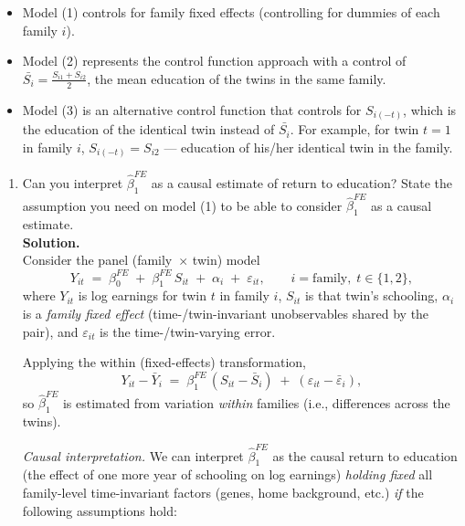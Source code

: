 \documentclass[12pt]{article}
\begin{document}
\begin{itemize}
  \item Model (1) controls for family fixed effects (controlling for dummies of each family $i$).
  \item Model (2) represents the control function approach with a control of $\bar{S_i} = \frac{S_{i1}+S_{i2}}{2}$, the mean education of the twins in the same family.
  \item Model (3) is an alternative control function that controls for $S_{i(-t)}$, which is the education of the identical twin instead of $\bar{S_i}$. For example, for twin $t=1$ in family $i$, $S_{i(-t)}=S_{i2}$ — education of his/her identical twin in the family.
\end{itemize}

\begin{enumerate}[label=\textbf{(\alph*)}, leftmargin=1.5em]
  \item Can you interpret $\hat{\beta}_1^{FE}$ as a causal estimate of return to education? State the assumption you need on model (1) to be able to consider $\hat{\beta}_1^{FE}$ as a causal estimate.\\[0.5em]
  
  \textbf{Solution.} \\
  Consider the panel (family~$\times$ twin) model
    \[
    Y_{it} \;=\; \beta^{FE}_0 \;+\; \beta^{FE}_1\, S_{it} \;+\; \alpha_i \;+\; \varepsilon_{it},
    \qquad i=\text{family},\; t\in\{1,2\},
    \]
    where $Y_{it}$ is log earnings for twin $t$ in family $i$, $S_{it}$ is that twin’s schooling,
    $\alpha_i$ is a \emph{family fixed effect} (time-/twin-invariant unobservables shared by the pair),
    and $\varepsilon_{it}$ is the time-/twin-varying error.

    Applying the within (fixed-effects) transformation,
    \[
    Y_{it}-\bar Y_i \;=\; \beta^{FE}_1\,(S_{it}-\bar S_i) \;+\; (\varepsilon_{it}-\bar\varepsilon_i),
    \]
    so $\hat\beta^{FE}_1$ is estimated from variation \emph{within} families (i.e., differences across the twins).

    \smallskip
    \emph{Causal interpretation.}
    We can interpret $\hat\beta^{FE}_1$ as the causal return to education (the effect of one more year of schooling on log earnings) \emph{holding fixed} all family-level time-invariant factors (genes, home background, etc.) \emph{if} the following assumptions hold:


\end{enumerate}
\end{document}
